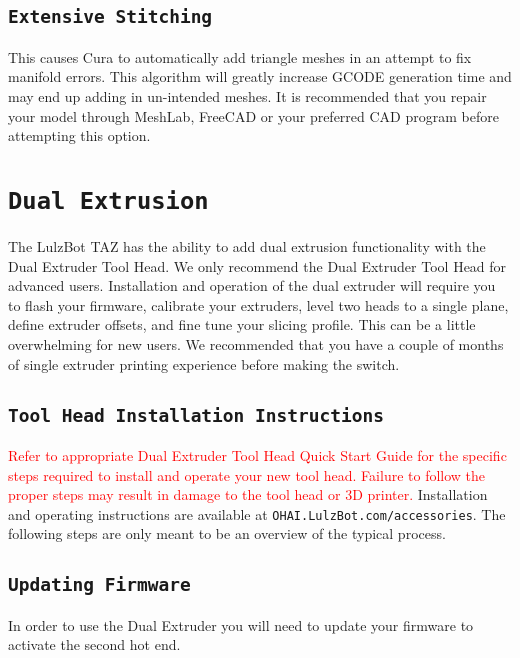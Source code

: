 \subsection{\texttt{Extensive Stitching}}
This causes Cura to automatically add triangle meshes in an attempt to fix manifold errors. This algorithm will greatly increase GCODE generation time and may end up adding in un-intended meshes. It is recommended that you repair your model through MeshLab, FreeCAD or your preferred CAD program before attempting this option.

\section{\texttt{Dual Extrusion}}
The LulzBot TAZ has the ability to add dual extrusion functionality with the Dual Extruder Tool Head. We only recommend the Dual Extruder Tool Head for advanced users. Installation and operation of the dual extruder will require you to flash your firmware, calibrate your extruders, level two heads to a single plane, define extruder offsets, and fine tune your slicing profile. This can be a little overwhelming for new users. We recommended that you have a couple of months of single extruder printing experience before making the switch. 

\subsection{\texttt{Tool Head Installation Instructions}}
\textcolor{red}{Refer to appropriate Dual Extruder Tool Head Quick Start Guide for the specific steps required to install and operate your new tool head. Failure to follow the proper steps may result in damage to the tool head or 3D printer.} Installation and operating instructions are available at \texttt{OHAI.LulzBot.com/accessories}. The following steps are only meant to be an overview of the typical process.

\subsection{\texttt{Updating Firmware}}
In order to use the Dual Extruder you will need to update your firmware to activate the second hot end.

